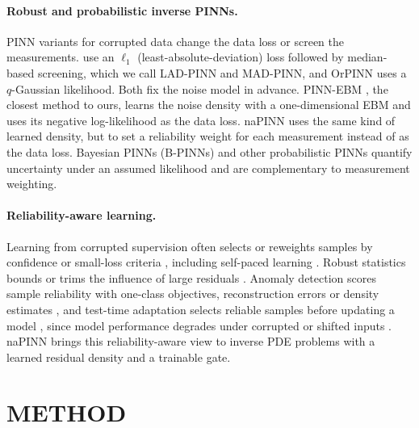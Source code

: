 \documentclass[twoside]{article}
\begin{document}
\paragraph{Robust and probabilistic inverse PINNs.}
PINN variants for corrupted data change the data loss or screen the
measurements. \citet{Peng2022} use an $\ell_1$
(least-absolute-deviation) loss followed by median-based screening, which we
call LAD-PINN and MAD-PINN, and OrPINN \citep{Duarte2025} uses a $q$-Gaussian
likelihood. Both fix the noise model in advance. PINN-EBM \citep{Pilar2024}, the
closest method to ours, learns the noise density with a one-dimensional EBM
\citep{LeCun2006} and uses its negative log-likelihood as the data loss.
naPINN uses the same kind of learned density, but to set a reliability weight
for each measurement instead of as the data loss. Bayesian PINNs (B-PINNs) \citep{Yang2021} and other probabilistic PINNs
\citep{Yang2019} quantify uncertainty under an assumed likelihood and are
complementary to measurement weighting.

\paragraph{Reliability-aware learning.}
Learning from corrupted supervision often selects or reweights samples by
confidence or small-loss criteria \citep{Natarajan2013, Jiang2018, Han2018, Li2020},
including self-paced learning \citep{Kumar2010}. Robust statistics bounds or trims the influence of large residuals
\citep{Huber1973, Hampel1974, Rousseeuw1984}. Anomaly detection scores sample
reliability with one-class objectives, reconstruction errors or density
estimates \citep{Chandola2013, Ruff2018, Pang2021}, and test-time adaptation
selects reliable samples before updating a model \citep{Yang2024, Wang2024DSS},
since model performance degrades under corrupted or shifted inputs
\citep{Hendrycks2019, Ovadia2019}. naPINN brings this reliability-aware view to
inverse PDE problems with a learned residual density and a trainable gate.

\section{METHOD}
\label{sec:method}
\end{document}
